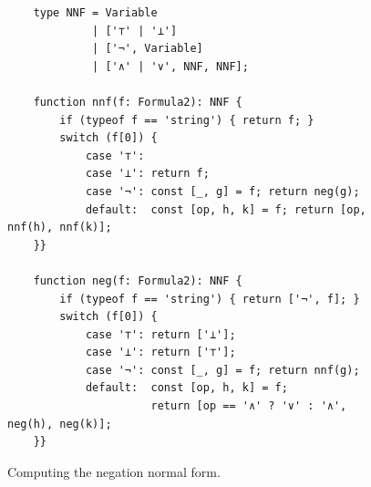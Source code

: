 \begin{figure}[!ht]
  \centering
\begin{verbatim}
    type NNF = Variable 
             | ['⊤' | '⊥'] 
             | ['¬', Variable] 
             | ['∧' | '∨', NNF, NNF];
    
    function nnf(f: Formula2): NNF {
        if (typeof f == 'string') { return f; }
        switch (f[0]) {
            case '⊤':
            case '⊥': return f;
            case '¬': const [_, g] = f; return neg(g);    
            default:  const [op, h, k] = f; return [op, nnf(h), nnf(k)]; 
    }}
    
    function neg(f: Formula2): NNF {
        if (typeof f == 'string') { return ['¬', f]; }
        switch (f[0]) {
            case '⊤': return ['⊥'];
            case '⊥': return ['⊤'];
            case '¬': const [_, g] = f; return nnf(g);    
            default:  const [op, h, k] = f;
                      return [op == '∧' ? '∨' : '∧', neg(h), neg(k)]; 
    }}
\end{verbatim}
\vspace*{-0.3cm}
  \caption{Computing the negation normal form.}
  \label{fig:nnf}
\end{figure}


